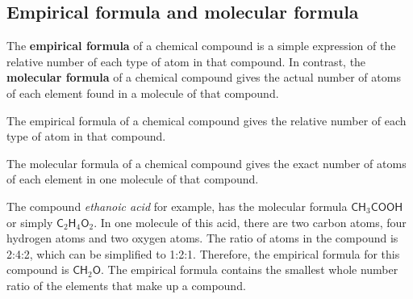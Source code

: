 \subsection*{Empirical formula and molecular formula}
      \label{m38712*id280317}The \textbf{empirical formula} of a chemical compound is a simple expression of the relative number of each type of atom in that compound. In contrast, the \textbf{molecular formula} of a chemical compound gives the actual number of atoms of each element found in a molecule of that compound.\par 
\label{m38712*fhsst!!!underscore!!!id885}
 { \label{m38712*meaningfhsst!!!underscore!!!id885}
      \label{m38712*id280341}The empirical formula of a chemical compound gives the relative number of each type of atom in that compound. \par 
       } 
\label{m38712*fhsst!!!underscore!!!id888}
 { \label{m38712*meaningfhsst!!!underscore!!!id888}
      \label{m38712*id280360}The molecular formula of a chemical compound gives the exact number of atoms of each element in one molecule of that compound. \par 
       } 
      \label{m38712*id280372}The compound \textsl{ethanoic acid} for example, has the molecular formula $\mathsf{CH}{}_{3}\mathsf{COOH}$ or simply $\mathsf{C}{}_{2}\mathsf{H}{}_{4}\mathsf{O}{}_{2}$. In one molecule of this acid, there are two carbon atoms, four hydrogen atoms and two oxygen atoms. The ratio of atoms in the compound is 2:4:2, which can be simplified to 1:2:1. Therefore, the empirical formula for this compound is $\mathsf{CH}{}_{2}\mathsf{O}$. The empirical formula contains the smallest whole number ratio of the elements that make up a compound.\par 
